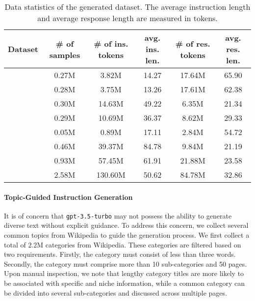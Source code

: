 \documentclass[11pt]{article}
\newcommand{\llm}[1]{\texttt{#1}\xspace}
\newcommand{\chatgpt}{\llm{gpt-3.5-turbo}}
\begin{document}
\begin{table*}[t]
\centering
\small
\begin{tabular}{@{}lccccc@{}}
\toprule
Dataset              & \# of samples & \# of ins. tokens & avg. ins. len. & \# of res. tokens & avg. res. len. \\ \midrule
            & 0.27M         & \phantom{00}3.82M & 14.27          & 17.64M            & 65.90          \\
           & 0.28M         & \phantom{00}3.75M & 13.26          & 17.61M            & 62.38          \\
        & 0.30M         & \phantom{0}14.63M & 49.22          & \phantom{0}6.35M  & 21.34          \\
          & 0.29M         & \phantom{0}10.69M & 36.37          & \phantom{0}8.62M  & 29.33          \\
        & 0.05M       & \phantom{00}0.89M & 17.11          & \phantom{0}2.84M  & 54.72          \\
       & 0.46M         & \phantom{0}39.37M & 84.78          & \phantom{0}9.84M  & 21.19          \\
         & 0.93M         & \phantom{0}57.45M & 61.91          & 21.88M            & 23.58          \\ \midrule
              & 2.58M         & 130.60M           & 50.62          & 84.78M            & 32.86          \\ \bottomrule
\end{tabular}
\caption{
    Data statistics of the generated dataset.
    The average instruction length and average response length are measured in tokens.
}
\label{tab:data_stat}
\end{table*} \paragraph{Topic-Guided Instruction Generation}
It is of concern that \chatgpt may not possess the ability to generate diverse text without explicit guidance. 
To address this concern, we collect several common topics from Wikipedia to guide the generation process.
We first collect a total of 2.2M categories from Wikipedia.
These categories are filtered based on two requirements. Firstly, the category must consist of less than three words. Secondly, the category must comprise more than 10 sub-categories and 50 pages.
Upon manual inspection, we note that lengthy category titles are more likely to be associated with specific and niche information, while a common category can be divided into several sub-categories and discussed across multiple pages. 
\end{document}
